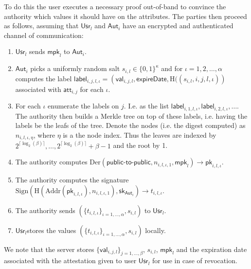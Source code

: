 \documentclass[11pt]{article} %
\newcommand{\Hash}{\ensuremath{\mathrm{H}}}
\newcommand{\aut}{\ensuremath{\mathsf{Aut}_i}}
\newcommand{\att}{\ensuremath{\mathsf{att}_{i,j}}}
\newcommand{\val}{\ensuremath{\mathsf{val}_{i,j,l}}}
\newcommand{\usr}{\ensuremath{\mathsf{Usr}_l}}
\newcommand{\lab}{\ensuremath{\mathsf{label}}}
\newcommand{\mpk}{\ensuremath{\mathsf{mpk}}}
\newcommand{\pk}{\ensuremath{\mathsf{pk}}}
\newcommand{\sk}{\ensuremath{\mathsf{sk}}}
\newcommand{\expireDate}{\ensuremath{\mathsf{expireDate}}}
\newcommand{\Der}{\ensuremath{\mathrm{Der}}}
\newcommand{\Sign}{\ensuremath{\mathrm{Sign}}}
\newcommand{\Addr}{\ensuremath{\mathrm{Addr}}}
\begin{document}
To do this the user executes a necessary proof out-of-band to convince the authority which values it should have on the attributes. The parties then proceed as follows, assuming that $\usr$ and $\aut$ have an encrypted and authenticated channel of communication:
\begin{enumerate}
	\item $\usr$ sends $\mpk_l$ to $\aut$.
	\item $\aut$ picks a uniformly random salt $s_{i,l}\in\{0,1\}^\kappa$ and for $\iota=1, 2, \dots, \alpha$ computes the label $\lab_{i,j,l,\iota}=\left(\val, \expireDate, \Hash((s_{i,l}, i, j, l, \iota)\right)$ associated with $\att$ for each $\iota$.
	\item For each $\iota$ enumerate the labels on $j$. I.e. as the list $\lab_{i,1,l,\iota}, \lab_{i,2,l,\iota}, \dots$. The authority then builds a Merkle tree on top of these labels, i.e. having the labels be the leafs of the tree. Denote the nodes (i.e. the digest computed) as $n_{i,l,\iota, \eta}$, where $\eta$ is a the node index. Thus the leaves are indexed by $2^{\lceil\log_2(\beta)\rceil}, \dots, 2^{\lceil\log_2(\beta)\rceil}+\beta-1$ and the root by 1.
	\item The authority computes $\Der(\mathsf{public}\mbox{-} \mathsf{to}\mbox{-} \mathsf{public}, n_{i,l,\iota, 1}, \mpk_l)\to \pk_{i,l,\iota}$.
	\item The authority computes the signature $\Sign\left( \Hash\left(\Addr(\pk_{i,l,\iota}), n_{i,l,\iota, 1}\right), \sk_{\aut}\right)\to t_{i,l,\iota}$.
	\item The authority sends $(\{t_{i,l,\iota}\}_{\iota = 1, \dots, \alpha}, s_{i,l})$ to $\usr$.
	\item \usr stores the values $(\{t_{i,l,\iota}\}_{\iota = 1, \dots, \alpha}, s_{i,l})$ locally.
\end{enumerate}
We note that the server stores $\{\val\}_{j=1, \dots, \beta}$, $s_{i,l}$, $\mpk_l$ and the expiration date associated with the attestation given to user $\usr$ for use in case of revocation.
\end{document}
